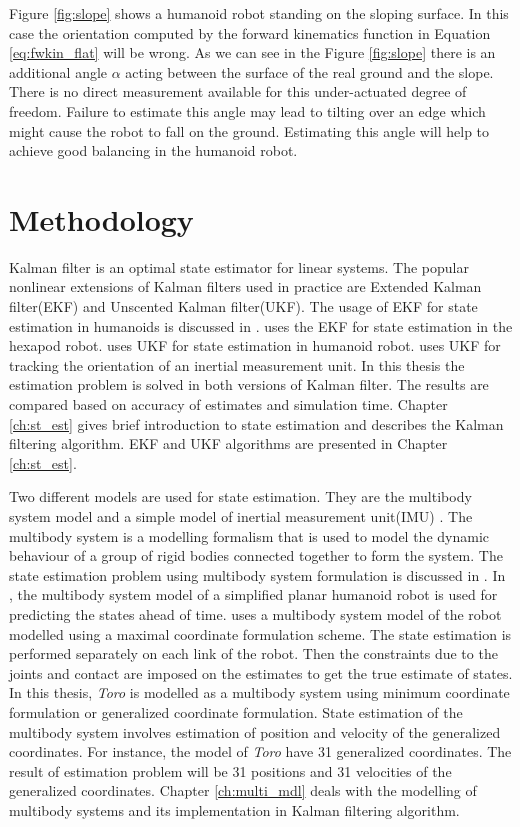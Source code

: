     Figure \ref{fig:slope} shows a humanoid robot standing on the sloping surface. In this case the orientation computed by the forward kinematics function in Equation \ref{eq:fwkin_flat} will be wrong. As we can see in the Figure \ref{fig:slope} there is an additional angle $\alpha$ acting between the surface of the real ground and the slope. There is no direct measurement available for this under-actuated degree of freedom. Failure to estimate this angle may lead to  tilting over an edge which might cause the robot to fall on the ground. Estimating this angle will help to achieve good balancing in the humanoid robot.

 \section{Methodology} 
Kalman filter is an optimal state estimator for linear systems. The popular nonlinear extensions of Kalman filters used in practice are Extended Kalman filter(EKF) and Unscented Kalman filter(UKF). The usage of EKF for state estimation in humanoids is discussed in \citep{atk12}. \citep{bloe12} uses the EKF for state estimation in the hexapod robot. \citep{oli12} uses UKF for state estimation in humanoid robot. \citep{edg03} uses UKF for tracking the orientation of an inertial measurement unit. In this thesis the estimation problem is solved in both versions of Kalman filter. The results are compared based on accuracy of estimates and simulation time. Chapter \ref{ch:st_est} gives brief introduction to state estimation and describes the Kalman filtering algorithm. EKF and UKF algorithms are presented in Chapter \ref{ch:st_est}.

    Two different models are used for state estimation. They are the multibody system model and a simple model of  inertial measurement unit(IMU) \citep{bloe12}. The multibody system is a modelling formalism that is used to model the dynamic behaviour of a group of rigid bodies connected together to form the system. The state estimation problem using multibody system formulation is discussed in \citep{atk12}. In \citep{atk12}, the multibody system model of a simplified planar humanoid robot is used for predicting the states ahead of time. \citep{oli12} uses a multibody system model of the robot modelled using a maximal coordinate formulation scheme. The state estimation is performed separately on each link of the robot. Then the constraints due to the joints and contact are imposed on the estimates to get the true estimate of states. In this thesis, \emph{Toro} is modelled as a multibody system using minimum coordinate formulation or generalized coordinate formulation. State estimation of the multibody system involves estimation of position and velocity of the generalized coordinates. For instance, the model of \emph{Toro} have 31 generalized coordinates. The result of estimation problem will be 31 positions and 31 velocities of the generalized coordinates. Chapter \ref{ch:multi_mdl} deals with the modelling of multibody systems and its implementation in Kalman filtering algorithm. 
    
